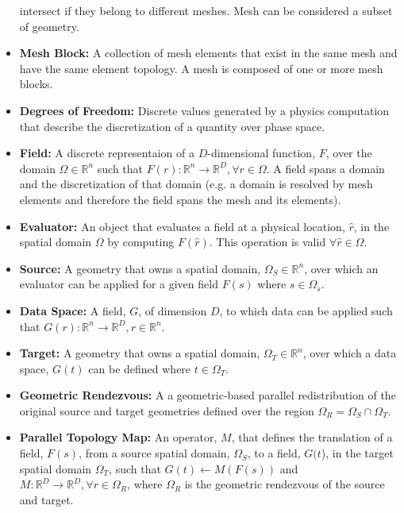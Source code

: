 \documentclass[letterpaper,12pt]{article}
\begin{document}
\begin{itemize}
  intersect if they belong to different meshes. Mesh can be considered
  a subset of geometry.
\item {\bf Mesh Block:} A collection of mesh elements that exist in
  the same mesh and have the same element topology.  A mesh is 
  composed of one or more mesh blocks.
\item {\bf Degrees of Freedom:} Discrete values generated by a physics
  computation that describe the discretization of a quantity over
  phase space.
\item {\bf Field:} A discrete representaion of a $D$-dimensional
  function, $F$, over the domain $\Omega \in \mathbb{R}^n$ such that
  $F(r) : \mathbb{R}^n \rightarrow \mathbb{R}^D, \forall r \in
  \Omega$. A field spans a domain and the discretization of that
  domain (e.g. a domain is resolved by mesh elements and therefore the
  field spans the mesh and its elements).
\item {\bf Evaluator:} An object that evaluates a field at a physical
  location, $\hat{r}$, in the spatial domain $\Omega$ by computing
  $F(\hat{r})$. This operation is valid $\forall \hat{r} \in \Omega$.
\item {\bf Source:} A geometry that owns a spatial domain, $\Omega_S
  \in \mathbb{R}^n$, over which an evaluator can be applied for a
  given field $F(s)$ where $s \in \Omega_s$.
\item {\bf Data Space:} A field, $G$, of dimension $D$, to which data
  can be applied such that $G(r) : \mathbb{R}^n \rightarrow
  \mathbb{R}^D, r \in \mathbb{R}^n$.
\item {\bf Target:} A geometry that owns a spatial domain, $\Omega_T
  \in \mathbb{R}^n$, over which a data space, $G(t)$ can be defined
  where $t \in \Omega_T$.
\item{\bf Geometric Rendezvous:} A a geometric-based parallel
  redistribution of the original source and target geometries defined
  over the region $\Omega_R = \Omega_S \cap \Omega_T$.
\item{\bf Parallel Topology Map:} An operator, $M$, that defines the
  translation of a field, $F(s)$, from a source spatial domain,
  $\Omega_S$, to a field, $G(t$), in the target spatial domain
  $\Omega_T$, such that $G(t)\leftarrow M(F(s))$ and $M: \mathbb{R}^D
  \rightarrow \mathbb{R}^D, \forall r \in \Omega_R$, where $\Omega_R$
  is the geometric rendezvous of the source and target.
\end{itemize}

\clearpage

\end{document}
